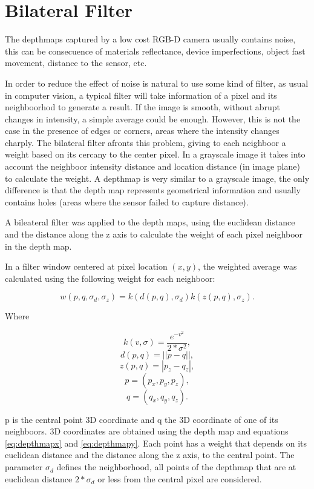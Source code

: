 \section{Bilateral Filter}


The depthmaps captured by a low cost RGB-D camera usually contains noise, this can be 
consecuence of materials reflectance, device imperfections, object fast movement, distance to the 
sensor, etc. 

In order to reduce the effect of noise is natural to use some kind of filter, as usual in computer 
vision, a typical filter will take information of a pixel and its neighboorhod to generate a result. 
If the image is smooth, without abrupt changes in intensity, a simple average could be enough. However, this 
is not the case in the presence of edges or corners, areas where the intensity changes charply. 
The bilateral filter afronts this problem, giving to each neighboor a weight based on its cercany  
to the center pixel. In a grayscale image it takes into account 
the neighboor intensity distance and location distance (in image plane) to calculate the weight.  A depthmap is very similar to a grayscale 
image, the only difference is that the depth map represents geometrical information and usually contains holes 
(areas where the sensor failed to capture distance). 

A bileateral filter was applied to the depth maps, using the euclidean distance and the distance along the z axis to calculate 
the weight of each pixel neighboor in the depth map.

In a filter window centered at pixel location $(x,y)$, the weighted average was calculated using the following weight for each neighboor:


$$ w(p,q,\sigma_d,\sigma_z) = k(d(p,q),\sigma_d) k(z(p,q),\sigma_z). $$

\noindent Where 

$$ k(v,\sigma) = \frac{e^{-v^2}}{2*\sigma^2}, $$
$$ d(p,q) = ||p - q||, $$
$$ z(p,q) = |p_z - q_z|, $$
$$ p = (p_x,p_y,p_z), $$ 
$$ q = (q_x,q_y,q_z). $$

\noindent p is the central point 3D coordinate and q the 3D coordinate of one of its neighboors. 3D coordinates are obtained using
 the depth map and equations \ref{eq:depthmapx} and \ref{eq:depthmapy}.  Each point has a weight that depends on its euclidean distance and
 the distance along the z axis, to the central point. The parameter $\sigma_d$ defines 
the neighborhood, all points of the depthmap that are at euclidean distance $2*\sigma_d$ or less from the central pixel are considered.


